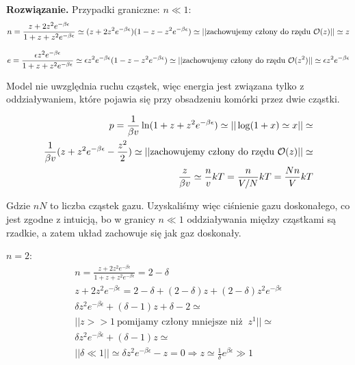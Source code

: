 \documentclass[11pt,a4paper]{article}
\newenvironment{solution}{\vspace{1cm} \par\textbf{Rozwiązanie.} \vspace{1cm}}{}
\begin{document}
\begin{solution}
Przypadki graniczne: 
$n \ll 1$:
\begin{align*}
  n = \frac{z + 2 z^2 e^{-\beta \epsilon}}{1 + z + z^2 e^{-\beta \epsilon}} \simeq 
  (z + 2 z^2 e^{-\beta \epsilon})(1 - z - z^2 e^{-\beta \epsilon}) \simeq  
  ||\text{zachowujemy człony do rzędu}~{\cal O}(z)|| \simeq z
\end{align*}

\begin{align*}
    e = \frac{\epsilon z^2 e^{-\beta \epsilon}}{1 + z + z^2 e^{-\beta \epsilon}} \simeq
    \epsilon z^2 e^{-\beta \epsilon} (1 - z - z^2 e^{-\beta \epsilon}) \simeq
    ||\text{zachowujemy człony do rzędu}~{\cal O}(z^2)|| \simeq \epsilon z^2 e^{-\beta \epsilon}
\end{align*}

Model nie uwzględnia ruchu cząstek, więc energia jest związana tylko 
z oddziaływaniem, które pojawia się przy obsadzeniu komórki przez dwie cząstki.

\begin{align*}
    p = \frac{1}{\beta v} \ln (1 + z + z^2 e^{-\beta \epsilon}) \simeq
    || \log(1+x) \simeq x || \simeq \\
    \frac{1}{\beta v} (z + z^2 e^{-\beta \epsilon} - \frac{z^2}{2}) \simeq 
    ||\text{zachowujemy człony do rzędu}~{\cal O}(z)|| \simeq \\
    \frac{z}{\beta v} \simeq \frac{n}{v} kT = \frac{n}{V/N} kT = \frac{N n}{V} kT
\end{align*}

Gdzie $nN$ to liczba cząstek gazu. Uzyskaliśmy więc ciśnienie gazu doskonałego, 
co jest zgodne z intuicją, 
bo w granicy $n \ll 1$ oddziaływania między cząstkami są rzadkie, 
a zatem układ zachowuje się jak gaz doskonały.

\newpage

$n=2$:
\begin{align*}
  n = \frac{z + 2 z^2 e^{-\beta \epsilon}}{1 + z + z^2 e^{-\beta \epsilon}} = 2-\delta\\
  z + 2 z^2 e^{-\beta \epsilon} = 2-\delta + (2 - \delta) z + (2 - \delta) z^2 e^{-\beta \epsilon} \\
  \delta z^2 e^{-\beta \epsilon} + (\delta - 1) z + \delta - 2 \simeq \\
  || z >> 1~\text{pomijamy człony mniejsze niż }~z^{1} || \simeq \\
  \delta z^2 e^{-\beta \epsilon} + (\delta - 1) z \simeq \\
  || \delta \ll 1 || \simeq
  \delta z^2 e^{-\beta \epsilon} - z = 0 \Rightarrow
  z \simeq \frac{1}{\delta} e^{\beta \epsilon} \gg 1
\end{align*}


\end{solution}
\end{document}
